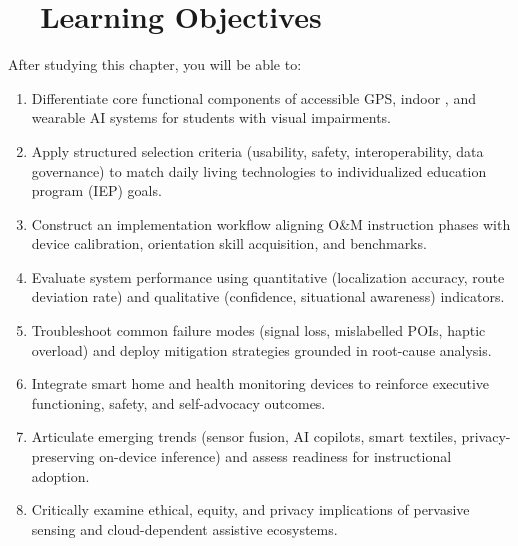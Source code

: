 \section{~~Learning Objectives}\label{ch8:sec:learning-objectives}
After studying this chapter, you will be able to:
\begin{enumerate}
	\item Differentiate core functional components of accessible GPS, indoor , and wearable AI systems for students with visual impairments.\supercite{AFBGPS2023, navilens}
	\item Apply structured selection criteria (usability, safety, interoperability, data governance) to match daily living technologies to individualized education program (IEP) goals.\supercite{AEMCenter, IDEA2004}
	\item Construct an implementation workflow aligning O\&M instruction phases with device calibration, orientation skill acquisition, and  benchmarks.\supercite{OrientationMobilityInstruction, Holbrook2006}
	\item Evaluate system performance using quantitative (localization accuracy, route deviation rate) and qualitative (confidence, situational awareness) indicators.\supercite{InclusiveCityMaker2023, StudentOutcomesResearch}
	\item Troubleshoot common failure modes (signal loss, mislabelled POIs, haptic overload) and deploy mitigation strategies grounded in root-cause analysis.
	\item Integrate smart home and health monitoring devices to reinforce executive functioning, safety, and self-advocacy outcomes.\supercite{AllAboutVision2023}
	\item Articulate emerging trends (sensor fusion, AI copilots, smart textiles, privacy-preserving on-device inference) and assess readiness for instructional adoption.\supercite{bipedai, maitraye2024}
	\item Critically examine ethical, equity, and privacy implications of pervasive sensing and cloud-dependent assistive ecosystems.\supercite{AI_Ethics_Bias, DataPrivacyAI}
\end{enumerate}

